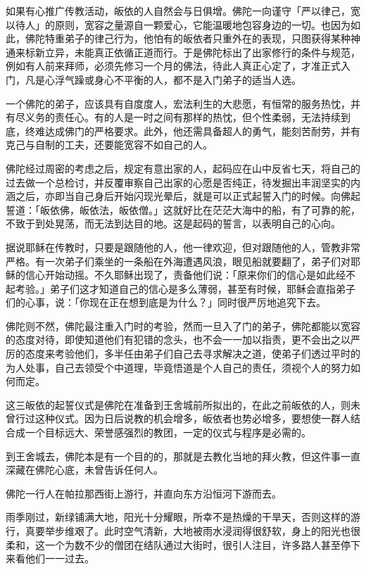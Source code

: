 \documentclass[twoside,openany]{book}
\begin{document}
如果有心推广传教活动，皈依的人自然会与日俱增。佛陀一向谨守「严以律己，宽以待人」的原则，宽容之量源自一颗爱心，它能温暖地包容身边的一切。也因为如此，佛陀特重弟子的律己行为，他怕有的皈依者只重外在的表现，只图获得某种神通来标新立异，未能真正依循正道而行。于是佛陀标出了出家修行的条件与规范，例如有人前来拜师，必须先修习一个月的佛法，待此人真正心定了，才准正式入门，凡是心浮气躁或身心不平衡的人，都不是入门弟子的适当人选。

一个佛陀的弟子，应该具有自度度人，宏法利生的大悲愿，有恒常的服务热忱，并有尽义务的责任心。有的人是一时之间有那样的热忱，但个性柔弱，无法持续到底，终难达成佛门的严格要求。此外，他还需具备超人的勇气，能刻苦耐劳，并有克己与自制的工夫，还要能宽容不如自己的人。

佛陀经过周密的考虑之后，规定有意出家的人，起码应在山中反省七天，将自己的过去做一个总检讨，并反覆审察自己出家的心愿是否纯正，待发掘出丰润坚实的内涵之后，亦即当自己身后开始闪现光晕后，就是可以正式起誓入门的时候。向佛起誓道：「皈依佛，皈依法，皈依僧。」这就好比在茫茫大海中的船，有了可靠的舵，不致于到处晃荡，而无法到达目的地。这是起码的誓言，以表明自己的心向。

据说耶稣在传教时，只要是跟随他的人，他一律欢迎，但对跟随他的人，管教非常严格。有一次弟子们乘坐的一条船在外海遭遇风浪，眼见船就要翻了，弟子们对耶稣的信心开始动摇。不久耶稣出现了，责备他们说：「原来你们的信心是如此经不起考验。」弟子们这才知道自己的信心是多么薄弱，甚至有时候，耶稣会直指弟子们的心事，说：「你现在正在想到底是为什么？」同时很严厉地追究下去。

佛陀则不然，佛陀最注重入门时的考验，然而一旦入了门的弟子，佛陀都能以宽容的态度对待，即使知道他们有犯错的念头，也不会一一加以指责，更不会出之以严厉的态度来考验他们，多半任由弟子们自己去寻求解决之道，使弟子们透过平时的为人处事，自己去领受个中道理，毕竟悟道是个人自己的责任，须视个人的努力如何而定。

这三皈依的起誓仪式是佛陀在准备到王舍城前所拟出的，在此之前皈依的人，则未曾行过这种仪式。因为日后说教的机会增多，皈依者也势必增多，要想使一群人结合成一个目标远大、荣誉感强烈的教团，一定的仪式与程序是必需的。

到王舍城去，佛陀本是有一个目的的，那就是去教化当地的拜火教，但这件事一直深藏在佛陀心底，未曾告诉任何人。

佛陀一行人在帕拉那西街上游行，并直向东方沿恒河下游而去。

雨季刚过，新绿铺满大地，阳光十分耀眼，所幸不是热燥的干旱天，否则这样的游行，真要举步维艰了。此时空气清新，大地被雨水浸润得很舒软，身上的阳光也很柔和，这一个为数不少的僧团在结队通过大街时，很引人注目，许多路人甚至停下来看他们一一过去。
\end{document}
